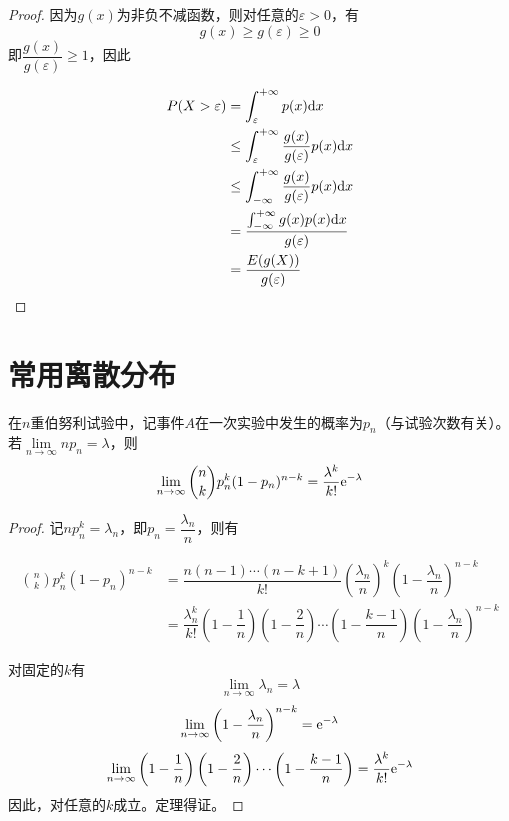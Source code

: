 \begin{proof}

    因为$g(x)$为非负不减函数，则对任意的$\varepsilon > 0$，有
    $$g(x) \geq g(\varepsilon) \geq 0$$
    即$\dfrac{g(x)}{g(\varepsilon)} \geq 1$，因此

    \begin{align*}
        P(X > \varepsilon) & = \int_{\varepsilon}^{+\infty}{p(x)}\mathrm{d} x \\
        & \leq \int_{\varepsilon}^{+\infty}{\dfrac{g(x)}{g(\varepsilon)}p(x)}\mathrm{d} x \\
        & \leq \int_{-\infty}^{+\infty}{\dfrac{g(x)}{g(\varepsilon)}p(x)}\mathrm{d} x \\
        & = \dfrac{\int_{-\infty}^{+\infty}{g(x)p(x)}\mathrm{d} x}{g(\varepsilon)} \\
        & = \dfrac{E(g(X))}{g(\varepsilon)}
    \end{align*}

\end{proof}

\section{常用离散分布}

\begin{theorem}[Poisson定理]

    在$n$重伯努利试验中，记事件$A$在一次实验中发生的概率为$p_n$（与试验次数有关）。若$\lim\limits_{n \to \infty}{n p_n} = \lambda$，则
    $$\lim\limits_{n \to \infty}{\binom{n}{k}p_n^k(1 - p_n)^{n - k}} = \dfrac{\lambda^k}{k!}\mathrm{e}^{-\lambda}$$

\end{theorem}

\begin{proof}

    记$n p_n^k = \lambda_n$，即$p_n = \dfrac{\lambda_n}{n}$，则有

    \begin{align*}
        \binom{n}{k}p_n^k(1 - p_n)^{n - k} & = \dfrac{n(n - 1) \cdots (n - k + 1)}{k!}\left(\dfrac{\lambda_n}{n}\right)^k\left(1 - \dfrac{\lambda_n}{n}\right)^{n - k} \\
        & = \dfrac{\lambda_n^k}{k!}\left(1 - \dfrac{1}{n}\right)\left(1 - \dfrac{2}{n}\right) \cdots \left(1 - \dfrac{k - 1}{n}\right)\left(1 - \dfrac{\lambda_n}{n}\right)^{n - k}
    \end{align*}

    对固定的$k$有
    $$\lim\limits_{n \to \infty}{\lambda_n} = \lambda$$
    $$\lim\limits_{n \to \infty}{\left(1 - \dfrac{\lambda_n}{n}\right)^{n - k}} = \mathrm{e}^{-\lambda}$$
    $$\lim\limits_{n \to \infty}{\left(1 - \dfrac{1}{n}\right)\left(1 - \dfrac{2}{n}\right) \cdots \left(1 - \dfrac{k - 1}{n}\right)} = \dfrac{\lambda^k}{k!}\mathrm{e}^{-\lambda}$$
    因此，对任意的$k$成立。定理得证。

\end{proof}
